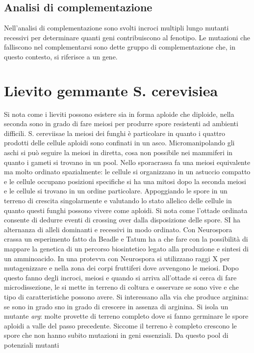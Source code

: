 \subsection{Analisi di complementazione}
Nell'analisi di complementazione sono svolti incroci multipli lungo mutanti recessivi per determinare quanti geni contribuiscono al fenotipo. Le mutazioni che falliscono nel 
complementarsi sono dette gruppo di complementazione che, in questo contesto, si riferisce a un gene. 



\section{Lievito gemmante S. cerevisiea}
Si nota come i lieviti possono esistere sia in forma aploide che diploide, nella seconda sono in grado di fare meiosi per produrre spore resistenti ad ambienti difficili. S. 
cereviisae la meiosi dei funghi \`e particolare in quanto i quattro prodotti delle cellule aploidi sono confinati in un asco. Micromanipolando gli aschi si pu\`o seguire la meiosi
in diretta, cosa non possibile nei mammiferi in quanto i gameti si trovano in un pool. Nello sporacrassa fa una meiosi equivalente ma molto ordinato spazialmente: le cellule si 
organizzano in un astuccio compatto e le cellule occupano posizioni specifiche si ha una mitosi dopo la seconda meiosi e le cellule si trovano in un ordine particolare. Appoggiando 
le spore in un terreno di crescita singolarmente e valutando lo stato allelico delle cellule in quanto questi funghi possono vivere come aploidi. Si nota come l'ottade ordinata
consente di dedurre eventi di crossing over dalla disposizione delle spore. SI ha alternanza di alleli dominanti e recessivi in modo ordinato. Con Neurospora crassa un esperimento
fatto da Beadle e Tatum ha a che fare con la possibilit\`a di mappare la genetica di un percorso biosintetico legato alla produzione e sintesi di un amminoacido. In una protevva
con Neurospora si utilizzano raggi X per mutagenizzare e nella zona dei corpi fruttiferi dove avvengono le meiosi. Dopo questo fanno degli incroci, meiosi e quando si arriva 
all'ottade si cerca di fare microdissezione, le si mette in terreno di coltura e osservare se sono vive e che tipo di caratteristiche possono avere. Si interessano alla via che
produce arginina: se sono in grado sno in grado di crescere in assenza di arginina. Si isola un mutante \emph{arg}: molte provette di terreno completo dove si fanno germinare le
spore aploidi a valle del passo precedente. Siccome il terreno \`e completo crescono le spore che non hanno subito mutazioni in geni essenziali. Da questo pool di potenziali mutanti
